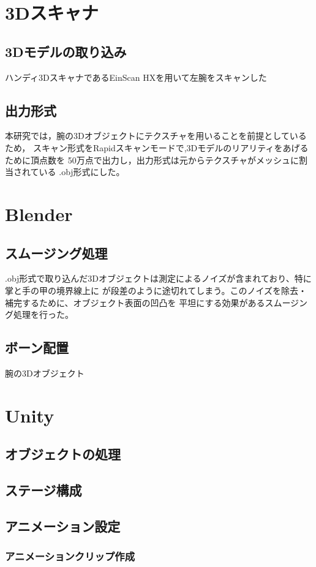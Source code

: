 \documentclass{ltjsreport}
\begin{document}
	\section{3Dスキャナ}
		\subsection{3Dモデルの取り込み}
			ハンディ3DスキャナであるEinScan HXを用いて左腕をスキャンした
		\subsection{出力形式}
			本研究では，腕の3Dオブジェクトにテクスチャを用いることを前提としているため，
			スキャン形式をRapidスキャンモードで,3Dモデルのリアリティをあげるために頂点数を
			50万点で出力し，出力形式は元からテクスチャがメッシュに割当されている
			.obj形式にした。
	\section{Blender}
		\subsection{スムージング処理}
			.obj形式で取り込んだ3Dオブジェクトは測定によるノイズが含まれており、特に掌と手の甲の境界線上に
			が段差のように途切れてしまう。このノイズを除去・補完するために、オブジェクト表面の凹凸を
			平坦にする効果があるスムージング処理を行った。
		\subsection{ボーン配置}
			腕の3Dオブジェクト
	\section{Unity}
		\subsection{オブジェクトの処理}
		\subsection{ステージ構成}
		\subsection{アニメーション設定}
			\subsubsection{アニメーションクリップ作成}
\end{document}
